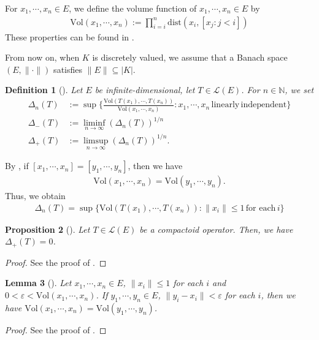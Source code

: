 \documentclass[12pt]{amsart}
\theoremstyle{plain}
\newtheorem{prop} {Proposition} [section]
\newtheorem{dfn} [prop]{Definition}
\newtheorem{lem}[prop]{Lemma}
\theoremstyle{definition}
\begin{document}
For $x_1, \cdots, x_n \in E$, we define the volume function of $x_1, \cdots, x_n \in E$ by
\begin{align*}
  \text{Vol}(x_1, \cdots, x_n) := \prod_{i=i}^n \text{dist}(x_i, [x_j : j < i])
\end{align*}
These properties can be found in \cite[Chapter 1]{note}.

From now on, when $K$ is discretely valued, we assume that a Banach space $(E,\|\cdot\|)$ satisfies $\|E\| \subseteq |K|$.

\begin{dfn}[{\cite[Definition 6.10]{comp}}]
Let $E$ be infinite-dimensional, let $T \in \mathcal{L}(E)$. For $n \in \mathbb{N}$, we set
\begin{align*}
  \Delta_n(T) &:= \sup\{ \frac{\mathrm{Vol}(T(x_1), \cdots, T(x_n))}{\mathrm{Vol}(x_1, \cdots, x_n)} : x_1, \cdots, x_n \, \mathrm{linearly} \, \mathrm{independent}\} \\
  \Delta_{-}(T) &:= \liminf_{n \to \infty}(\Delta_n(T))^{1/n} \\
  \Delta_{+}(T) &:= \limsup_{n \to \infty}(\Delta_n(T))^{1/n}.
\end{align*}
\end{dfn}

By \cite[Corollary 1.5]{note}, if $[x_1, \cdots, x_n] = [y_1, \cdots, y_n]$, then we have 
\begin{align*}
  \text{Vol}(x_1, \cdots, x_n) = \text{Vol}(y_1, \cdots, y_n).
\end{align*}
Thus, we obtain
\begin{align*}
  \Delta_n(T) = \sup \{ \text{Vol}(T(x_1), \cdots, T(x_n)) : \|x_i\| \le 1 \,\text{for each} \, i\}
\end{align*}

\begin{prop}[{\cite[Proposition 6.11]{comp}}] \label{app5}
  Let $T \in \mathcal{L}(E)$ be a compactoid operator. Then, we have $\Delta_{+}(T) = 0$.
\end{prop}
\begin{proof}
  See the proof of \cite[Proposition 6.11]{comp}.
\end{proof}

\begin{lem}[{\cite[Lemma 6.13]{comp}}] \label{app4}
  Let $x_1, \cdots, x_n \in E$, $\|x_i\| \le 1$ for each $i$ and $0 < \varepsilon < \mathrm{Vol}(x_1, \cdots, x_n)$. If $y_1, \cdots, y_n \in E$, $\|y_i - x_i\| < \varepsilon$ for each $i$, then we have $\mathrm{Vol}(x_1, \cdots, x_n) = \mathrm{Vol}(y_1, \cdots, y_n)$.
\end{lem}
\begin{proof}
  See the proof of \cite[Lemma 6.13]{comp}.
\end{proof}
\end{document}

